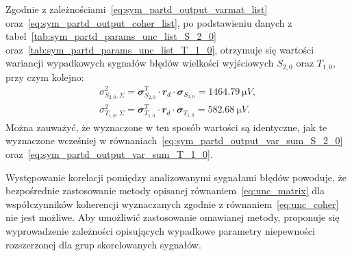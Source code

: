 Zgodnie z zależnościami~\eqref{eq:sym_partd_output_varmat_list} oraz~\eqref{eq:sym_partd_output_coher_list}, po podstawieniu danych z tabel~\ref{tab:sym_partd_params_unc_list_S_2_0} oraz~\ref{tab:sym_partd_params_unc_list_T_1_0}, otrzymuje się wartości wariancji wypadkowych sygnałów błędów wielkości wyjściowych $S_{2,0}$ oraz $T_{1,0}$, przy czym kolejno:
\begin{gather}
\sigma_{S_{2,0},\Sigma}^{2} = \mathbfit{\sigma}_{S_{2,0}}^{T} \cdot \mathbfit{r}_{d} \cdot \mathbfit{\sigma}_{S_{2,0}} = \qty{1464.79}{\micro V} \label{eq:sym_partd_output_varmat_S_2_0}, \\
\sigma_{T_{1,0},\Sigma}^{2} = \mathbfit{\sigma}_{T_{1,0}}^{T} \cdot \mathbfit{r}_{d} \cdot \mathbfit{\sigma}_{T_{1,0}} = \qty{582.68}{\micro V} \label{eq:sym_partd_output_varmat_T_1_0}.
\end{gather}
Można zauważyć, że wyznaczone w ten sposób wartości są identyczne, jak te wyznaczone wcześniej w równaniach~\eqref{eq:sym_partd_output_var_sum_S_2_0} oraz~\eqref{eq:sym_partd_output_var_sum_T_1_0}.

Występowanie korelacji pomiędzy analizowanymi sygnałami błędów powoduje, że bezpośrednie zastosowanie metody opisanej równaniem~\eqref{eq:unc_matrix} dla współczynników koherencji wyznaczanych zgodnie z równaniem~\eqref{eq:unc_coher} nie jest możliwe. Aby umożliwić zastosowanie omawianej metody, proponuje się wyprowadzenie zależności opisujących wypadkowe parametry niepewności rozszerzonej dla grup skorelowanych sygnałów.

